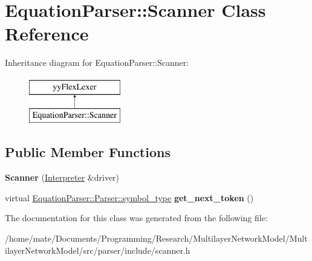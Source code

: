 \hypertarget{classEquationParser_1_1Scanner}{}\section{Equation\+Parser\+:\+:Scanner Class Reference}
\label{classEquationParser_1_1Scanner}
Inheritance diagram for Equation\+Parser\+:\+:Scanner\+:\begin{figure}[H]
\begin{center}
\leavevmode
\includegraphics[height=2.000000cm]{classEquationParser_1_1Scanner}
\end{center}
\end{figure}
\subsection*{Public Member Functions}
\begin{DoxyCompactItemize}
\item 
{\bfseries Scanner} (\hyperlink{classEquationParser_1_1Interpreter}{Interpreter} \&driver)\hypertarget{classEquationParser_1_1Scanner_a383aac4a7ce836b3c656675aaeeb32a6}{}\label{classEquationParser_1_1Scanner_a383aac4a7ce836b3c656675aaeeb32a6}

\item 
virtual \hyperlink{classEquationParser_1_1Parser_ac7f402ded60cb9ac9bb65f5d2bc9d79c}{Equation\+Parser\+::\+Parser\+::symbol\+\_\+type} {\bfseries get\+\_\+next\+\_\+token} ()\hypertarget{classEquationParser_1_1Scanner_a679ce79f0470304c865aa1060dd7d5cd}{}\label{classEquationParser_1_1Scanner_a679ce79f0470304c865aa1060dd7d5cd}

\end{DoxyCompactItemize}


The documentation for this class was generated from the following file\+:\begin{DoxyCompactItemize}
\item 
/home/mate/\+Documents/\+Programming/\+Research/\+Multilayer\+Network\+Model/\+Multilayer\+Network\+Model/src/parser/include/scanner.\+h\end{DoxyCompactItemize}
